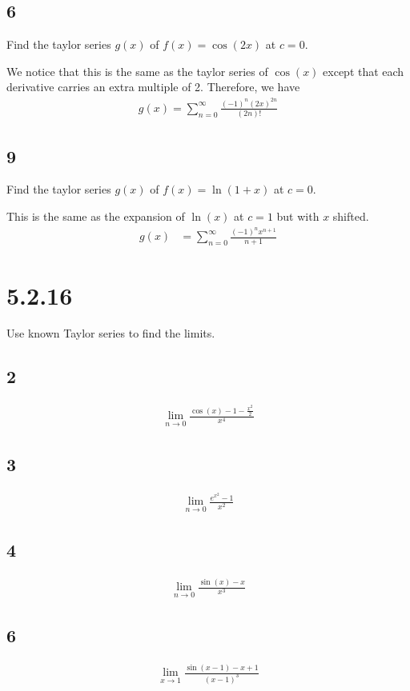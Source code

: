 \documentclass[12pt]{article}
\begin{document}
\subsection*{6}
Find the taylor series $g(x)$ of $f(x) = \cos(2x)$ at $c=0$.

We notice that this is the same as the taylor series of $\cos(x)$ except that each derivative carries an extra multiple of 2. Therefore, we have
\begin{align*}
    g(x) = \sum_{n=0}^\infty \frac{(-1)^n (2x)^{2n}}{(2n)!}
\end{align*}

\subsection*{9}
Find the taylor series $g(x)$ of $f(x) = \ln(1+x)$ at $c=0$.

This is the same as the expansion of $\ln(x)$ at $c=1$ but with $x$ shifted.
\begin{align*}
    g(x) &= \sum_{n=0}^\infty \frac{(-1)^n x^{n+1}}{n+1}
\end{align*}



\section*{5.2.16}
Use known Taylor series to find the limits.

\subsection*{2}
\begin{align*}
    \lim_{n\to0} \frac{\cos(x) - 1 - \frac{x^2}{2}}{x^4}
\end{align*}

\subsection*{3}
\begin{align*}
    \lim_{n\to0} \frac{e^{x^2} - 1}{x^2}
\end{align*}

\subsection*{4}
\begin{align*}
    \lim_{n\to0} \frac{\sin(x) - x}{x^3}
\end{align*}

\subsection*{6}
\begin{align*}
    \lim_{x\to1} \frac{\sin(x-1) - x + 1}{(x-1)^3}
\end{align*}
\end{document}
